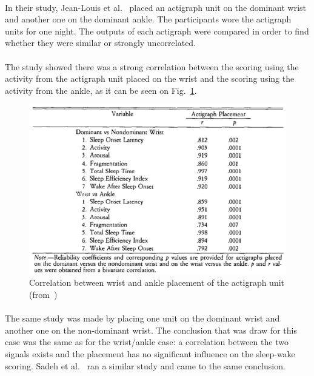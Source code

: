 \documentclass[a4paper,12pt]{article}
\begin{document}
\paragraph{}
In their study, Jean-Louis et al.~\cite{Jean-Louis1997a} placed an actigraph unit on the dominant wrist and another one on the dominant ankle. The participants wore the actigraph units for one night. The outputs of each actigraph were compared in order to find whether they were similar or strongly uncorrelated.

\paragraph{}
The study showed there was a strong correlation between the scoring using the activity from the actigraph unit placed on the wrist and the scoring using the activity from the ankle, as it can be seen on Fig.~\ref{actiPlacement1}.

\begin{figure}[H]
\centering
\includegraphics[scale=0.5]{Images/actiPlacement1.png}
\caption{Correlation between wrist and ankle placement of the actigraph unit (from~\cite{Jean-Louis1997a})}
\label{actiPlacement1}
\end{figure}

\paragraph{}
The same study was made by placing one unit on the dominant wrist and another one on the non-dominant wrist. The conclusion that was draw for this case was the same as for the wrist/ankle case: a correlation between the two signals exists and the placement has no significant influence on the sleep-wake scoring. Sadeh et al.~\cite{Sadeh1994} ran a similar study and came to the same conclusion.
\end{document}
